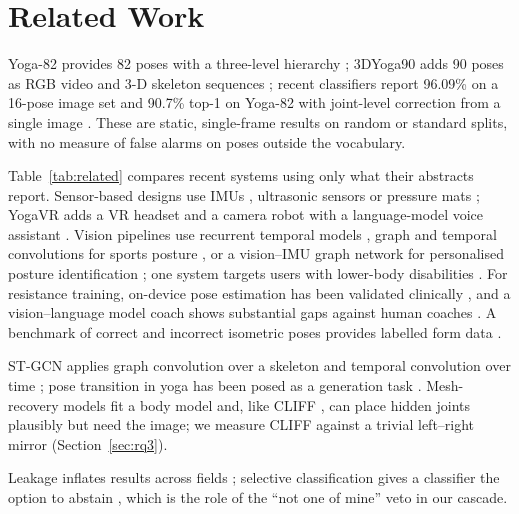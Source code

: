 \section{Related Work}\label{sec:related}
 Yoga-82 provides 82 poses with a three-level hierarchy \cite{verma2020yoga82}; 3DYoga90 adds 90 poses as RGB video and 3-D skeleton sequences \cite{kim2023yoga90}; recent classifiers report 96.09\% on a 16-pose image set \cite{mohiuddin2025skeleton} and 90.7\% top-1 on Yoga-82 with joint-level correction from a single image \cite{chi2026sage}. These are static, single-frame results on random or standard splits, with no measure of false alarms on poses outside the vocabulary.

 Table~\ref{tab:related} compares recent systems using only what their abstracts report. Sensor-based designs use IMUs \cite{sathyapriya2026posture}, ultrasonic sensors \cite{kamble2026yogamat} or pressure mats \cite{saravanapandian2025mat}; YogaVR adds a VR headset and a camera robot with a language-model voice assistant \cite{srinivasakumar2025yogavr}. Vision pipelines use recurrent temporal models \cite{gadhvi2025posepilot,haldar2026framework}, graph and temporal convolutions for sports posture \cite{yuan2025gtanet}, or a vision--IMU graph network for personalised posture identification \cite{vallabhaneni2026hybrid}; one system targets users with lower-body disabilities \cite{aggarwal2026chair}. For resistance training, on-device pose estimation has been validated clinically \cite{heo2026ondevice}, and a vision--language model coach shows substantial gaps against human coaches \cite{zuo2025formcoach}. A benchmark of correct and incorrect isometric poses provides labelled form data \cite{jaiswal2025isometric}.

 ST-GCN applies graph convolution over a skeleton and temporal convolution over time \cite{yan2018stgcn}; pose transition in yoga has been posed as a generation task \cite{dittakavi2025pose2pose}. Mesh-recovery models fit a body model \cite{loper2015smpl} and, like CLIFF \cite{li2022cliff}, can place hidden joints plausibly but need the image; we measure CLIFF against a trivial left--right mirror (Section~\ref{sec:rq3}).

 Leakage inflates results across fields \cite{kapoor2023leakage}; selective classification gives a classifier the option to abstain \cite{geifman2017selective}, which is the role of the ``not one of mine'' veto in our cascade.


